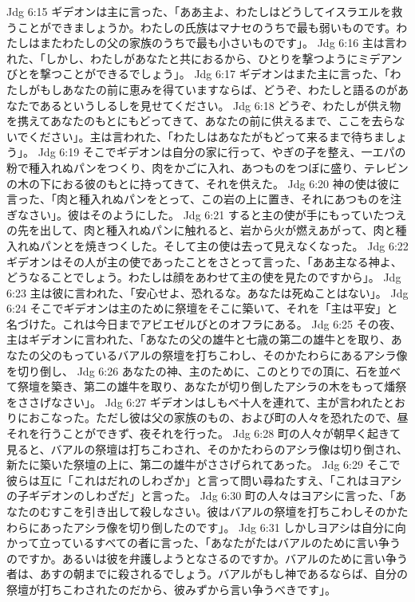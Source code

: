 Jdg 6:15  ギデオンは主に言った、「ああ主よ、わたしはどうしてイスラエルを救うことができましょうか。わたしの氏族はマナセのうちで最も弱いものです。わたしはまたわたしの父の家族のうちで最も小さいものです」。
Jdg 6:16  主は言われた、「しかし、わたしがあなたと共におるから、ひとりを撃つようにミデアンびとを撃つことができるでしょう」。
Jdg 6:17  ギデオンはまた主に言った、「わたしがもしあなたの前に恵みを得ていますならば、どうぞ、わたしと語るのがあなたであるというしるしを見せてください。
Jdg 6:18  どうぞ、わたしが供え物を携えてあなたのもとにもどってきて、あなたの前に供えるまで、ここを去らないでください」。主は言われた、「わたしはあなたがもどって来るまで待ちましょう」。
Jdg 6:19  そこでギデオンは自分の家に行って、やぎの子を整え、一エパの粉で種入れぬパンをつくり、肉をかごに入れ、あつものをつぼに盛り、テレビンの木の下におる彼のもとに持ってきて、それを供えた。
Jdg 6:20  神の使は彼に言った、「肉と種入れぬパンをとって、この岩の上に置き、それにあつものを注ぎなさい」。彼はそのようにした。
Jdg 6:21  すると主の使が手にもっていたつえの先を出して、肉と種入れぬパンに触れると、岩から火が燃えあがって、肉と種入れぬパンとを焼きつくした。そして主の使は去って見えなくなった。
Jdg 6:22  ギデオンはその人が主の使であったことをさとって言った、「ああ主なる神よ、どうなることでしょう。わたしは顔をあわせて主の使を見たのですから」。
Jdg 6:23  主は彼に言われた、「安心せよ、恐れるな。あなたは死ぬことはない」。
Jdg 6:24  そこでギデオンは主のために祭壇をそこに築いて、それを「主は平安」と名づけた。これは今日までアビエゼルびとのオフラにある。
Jdg 6:25  その夜、主はギデオンに言われた、「あなたの父の雄牛と七歳の第二の雄牛とを取り、あなたの父のもっているバアルの祭壇を打ちこわし、そのかたわらにあるアシラ像を切り倒し、
Jdg 6:26  あなたの神、主のために、このとりでの頂に、石を並べて祭壇を築き、第二の雄牛を取り、あなたが切り倒したアシラの木をもって燔祭をささげなさい」。
Jdg 6:27  ギデオンはしもべ十人を連れて、主が言われたとおりにおこなった。ただし彼は父の家族のもの、および町の人々を恐れたので、昼それを行うことができず、夜それを行った。
Jdg 6:28  町の人々が朝早く起きて見ると、バアルの祭壇は打ちこわされ、そのかたわらのアシラ像は切り倒され、新たに築いた祭壇の上に、第二の雄牛がささげられてあった。
Jdg 6:29  そこで彼らは互に「これはだれのしわざか」と言って問い尋ねたすえ、「これはヨアシの子ギデオンのしわざだ」と言った。
Jdg 6:30  町の人々はヨアシに言った、「あなたのむすこを引き出して殺しなさい。彼はバアルの祭壇を打ちこわしそのかたわらにあったアシラ像を切り倒したのです」。
Jdg 6:31  しかしヨアシは自分に向かって立っているすべての者に言った、「あなたがたはバアルのために言い争うのですか。あるいは彼を弁護しようとなさるのですか。バアルのために言い争う者は、あすの朝までに殺されるでしょう。バアルがもし神であるならば、自分の祭壇が打ちこわされたのだから、彼みずから言い争うべきです」。
